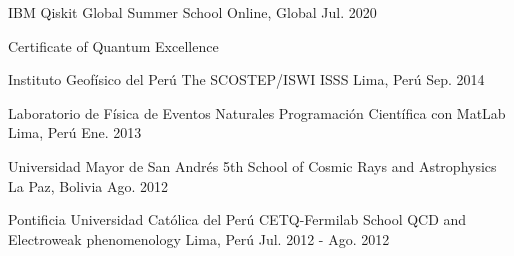 
\begin{cventries}

  \cventry
    {IBM} %
    {Qiskit Global Summer School} %
    {Online, Global} %
    {Jul. 2020} %
    {
      \begin{cvitems} %
        \item {Certificate of Quantum Excellence}
      \end{cvitems}
    }

  \cventry
    {Instituto Geofísico del Perú} %
    {The SCOSTEP/ISWI ISSS} %
    {Lima, Perú} %
    {Sep. 2014} %
    {}


  \cventry
    {Laboratorio de Física de Eventos Naturales} %
    {Programación Científica con MatLab} %
    {Lima, Perú} %
    {Ene. 2013} %
    {}

  \cventry
    {Universidad Mayor de San Andrés} %
    {5th School of Cosmic Rays and Astrophysics} %
    {La Paz, Bolivia} %
    {Ago. 2012} %
    {}

  \cventry
    {Pontificia Universidad Católica del Perú} %
    {CETQ-Fermilab School QCD and Electroweak phenomenology} %
    {Lima, Perú} %
    {Jul. 2012 - Ago. 2012} %
    {}


\end{cventries}
